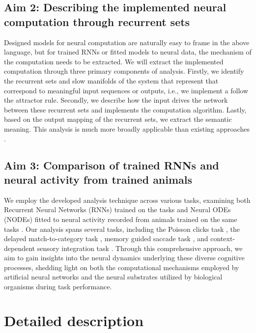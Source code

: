 \documentclass[12pt,letterpaper, onecolumn]{article}
\theoremstyle{definition}
\theoremstyle{remark}
\begin{document}
\subsection*{Aim 2: Describing the implemented neural computation through recurrent sets}
Designed models for neural computation are naturally easy to frame in the above language, but for trained RNNs or fitted models to neural data, the mechanism of the computation needs to be extracted. We will extract the implemented computation through three primary components of analysis. Firstly, we identify the recurrent sets and slow manifolds of the system that represent that correspond to meaningful input sequences or outputs, i.e., we implement a follow the attractor rule. Secondly, we describe how the input drives the network between these recurrent sets and implements the computation algorithm. Lastly, based on the output mapping of the recurrent sets, we extract the semantic meaning.
This analysis is much more broadly applicable than existing approaches \citep{sussillo2013blackbox, sussillo2014, beer2018, maheswaranathan2019universality, driscoll2022, mante2013context, turner2021charting, turner2023, casey1996, valente2022extracting}.

\subsection*{Aim 3: Comparison of trained RNNs and neural activity from trained animals}
We employ the developed analysis technique across various tasks, examining both Recurrent Neural Networks (RNNs) trained on the tasks and Neural ODEs (NODEs) fitted to neural activity recorded from animals trained on the same tasks \citep{zhao2016, pandarinath2018inferring, kim2021inferring}.
 Our analysis spans several tasks, including the Poisson clicks task \citep{brunton2013rats},
  the delayed match-to-category task \citep{chaisangmongkon2017computing},
  memory guided saccade task \citep{wimmer2014},
  and context-dependent sensory integration task \citep{mante2013context}.
   Through this comprehensive approach, we aim to gain insights into the neural dynamics underlying these diverse cognitive processes, shedding light on both the computational mechanisms employed by artificial neural networks and the neural substrates utilized by biological organisms during task performance.



\newpage
\section{Detailed description}
\end{document}
